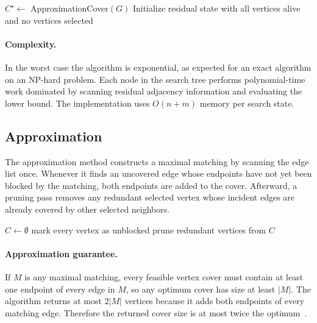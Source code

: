 \documentclass[sigconf,nonacm]{acmart}
\begin{document}
\begin{algorithm}[t]
\caption{Branch-and-Bound for MVC}
$C^\star \leftarrow$ ApproximationCover$(G)$\;
Initialize residual state with all vertices alive and no vertices selected\;
\end{algorithm}

\paragraph{Complexity.}
In the worst case the algorithm is exponential, as expected for an exact algorithm on an NP-hard problem. Each node in the search tree performs polynomial-time work dominated by scanning residual adjacency information and evaluating the lower bound. The implementation uses $O(n+m)$ memory per search state.

\subsection{Approximation}
The approximation method constructs a maximal matching by scanning the edge list once. Whenever it finds an uncovered edge whose endpoints have not yet been blocked by the matching, both endpoints are added to the cover. Afterward, a pruning pass removes any redundant selected vertex whose incident edges are already covered by other selected neighbors.

\begin{algorithm}[t]
\caption{Maximal-Matching 2-Approximation}
$C \leftarrow \emptyset$\;
mark every vertex as unblocked\;
prune redundant vertices from $C$\;
\end{algorithm}

\paragraph{Approximation guarantee.}
If $M$ is any maximal matching, every feasible vertex cover must contain at least one endpoint of every edge in $M$, so any optimum cover has size at least $|M|$. The algorithm returns at most $2|M|$ vertices because it adds both endpoints of every matching edge. Therefore the returned cover size is at most twice the optimum~\cite{vazirani}.
\end{document}
